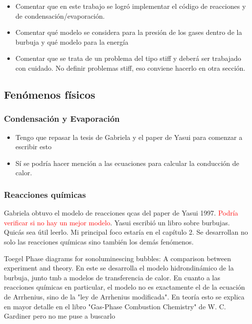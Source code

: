 \documentclass[aps,prb,twocolumn,superscriptaddress,floatfix,longbibliography,10pt]{revtex4-2}
\newif\ifptitle
\newif\ifpnumber
\newcounter{para}
\newcommand\ptitle[1]{\par\refstepcounter{para}
{\ifpnumber{\noindent\textcolor{lightgray}{\textbf{\thepara}}\indent}\fi}
{\ifptitle{\textbf{[{#1}]}}\fi}}
\begin{document}
\ptitle{¿Qué fenómenos se implementaron en este trabajo?}
\begin{itemize}
  \item Comentar que en este trabajo se logró implementar el código de reacciones y de condensación/evaporación.
  \item Comentar qué modelo se considera para la presión de los gases dentro de la burbuja y qué modelo para la energía
  \item Comentar que se trata de un problema del tipo stiff y deberá ser trabajado con cuidado. No definir problemas stiff, eso conviene hacerlo en otra sección.
\end{itemize}




\subsection{Fenómenos físicos}

\subsubsection{Condensación y Evaporación}

\begin{itemize}
  \item Tengo que repasar la tesis de Gabriela y el paper de Yasui para comenzar a escribir esto
  \item Sí se podría hacer mención a las ecuaciones para calcular la conducción de calor.
\end{itemize}



\subsubsection{Reacciones químicas}

Gabriela obtuvo el modelo de reacciones qcas del paper de Yasui 1997. \textcolor{red}{Podría verificar si no hay un mejor modelo}.
Yasui escribió un libro sobre burbujas. Quicás sea útil leerlo. Mi principal foco estaría en el capítulo 2. Se desarrollan no solo las reacciones químicas sino también los demás fenómenos.

Toegel Phase diagrams for sonoluminescing bubbles: A comparison between experiment and theory. En este se desarrolla el modelo hidrondinámico de la burbuja, junto tmb a modelos de transferencia de calor. En cuanto a las reacciones químicas en particular, el modelo no es exactamente el de la ecuación de Arrhenius, sino de la "ley de Arrhenius modificada". En teoría esto se explica en mayor detalle en el libro "Gas-Phase Combustion Chemistry" de W. C. Gardiner pero no me puse a buscarlo
\end{document}
